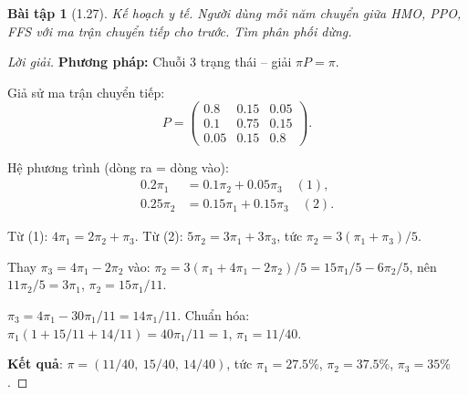 \documentclass[8pt,a4paper]{article}
\newtheorem{exercise}{Bài tập}
\newenvironment{solution}{\begin{proof}[Lời giải]}{\end{proof}}
\begin{document}
\begin{exercise}[1.27]
Kế hoạch y tế. Người dùng mỗi năm chuyển giữa HMO, PPO, FFS với ma trận chuyển tiếp cho trước. Tìm phân phối dừng.
\end{exercise}
\begin{solution}
\textbf{Phương pháp:} Chuỗi 3 trạng thái -- giải $\pi P = \pi$.

Giả sử ma trận chuyển tiếp:
\[
  P = \begin{pmatrix} 0.8 & 0.15 & 0.05 \\ 0.1 & 0.75 & 0.15 \\ 0.05 & 0.15 & 0.8 \end{pmatrix}.
\]

Hệ phương trình (dòng ra = dòng vào):
\begin{align*}
  0.2\pi_1 &= 0.1\pi_2 + 0.05\pi_3 \quad (1), \\
  0.25\pi_2 &= 0.15\pi_1 + 0.15\pi_3 \quad (2).
\end{align*}

Từ (1): $4\pi_1 = 2\pi_2 + \pi_3$. Từ (2): $5\pi_2 = 3\pi_1 + 3\pi_3$, tức $\pi_2 = 3(\pi_1 + \pi_3)/5$.

Thay $\pi_3 = 4\pi_1 - 2\pi_2$ vào: $\pi_2 = 3(\pi_1 + 4\pi_1 - 2\pi_2)/5 = 15\pi_1/5 - 6\pi_2/5$, nên $11\pi_2/5 = 3\pi_1$, $\pi_2 = 15\pi_1/11$.

$\pi_3 = 4\pi_1 - 30\pi_1/11 = 14\pi_1/11$. Chuẩn hóa: $\pi_1(1 + 15/11 + 14/11) = 40\pi_1/11 = 1$, $\pi_1 = 11/40$.

\textbf{Kết quả}: $\pi = (11/40,\ 15/40,\ 14/40)$, tức $\pi_1 = 27.5\%$, $\pi_2 = 37.5\%$, $\pi_3 = 35\%$.
\end{solution}
\end{document}
